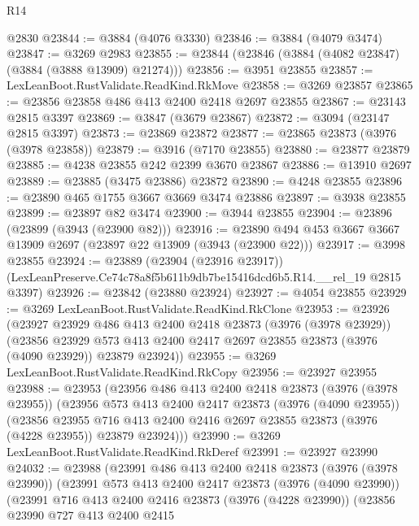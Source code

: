\begin{lexlean}{R14}
\begin{coremodule}
    @2830
@23844 := @3884 (@4076 @3330)
@23846 := @3884 (@4079 @3474)
@23847 := @3269 @2983
@23855 := @23844 (@23846 (@3884 (@4082 @23847) (@3884 (@3888 @13909) @21274)))
@23856 := @3951 @23855
@23857 := LexLeanBoot.RustValidate.ReadKind.RkMove
@23858 := @3269 @23857
@23865 := @23856 @23858 @486 @413 @2400 @2418 @2697 @23855
@23867 := @23143 @2815 @3397
@23869 := @3847 (@3679 @23867)
@23872 := @3094 (@23147 @2815 @3397)
@23873 := @23869 @23872
@23877 := @23865 @23873 (@3976 (@3978 @23858))
@23879 := @3916 (@7170 @23855)
@23880 := @23877 @23879
@23885 := @4238 @23855 @242 @2399 @3670 @23867
@23886 := @13910 @2697
@23889 := @23885 (@3475 @23886) @23872
@23890 := @4248 @23855
@23896 := @23890 @465 @1755 @3667 @3669 @3474 @23886
@23897 := @3938 @23855
@23899 := @23897 @82 @3474
@23900 := @3944 @23855
@23904 := @23896 (@23899 (@3943 (@23900 @82)))
@23916 := @23890 @494 @453 @3667 @3667 @13909 @2697 (@23897 @22 @13909 (@3943 (@23900 @22)))
@23917 := @3998 @23855
@23924 := @23889
    (@23904 (@23916 @23917))
    (LexLeanPreserve.Ce74c78a8f5b611b9db7be15416dcd6b5.R14.__rel_19 @2815 @3397)
@23926 := @23842 (@23880 @23924)
@23927 := @4054 @23855
@23929 := @3269 LexLeanBoot.RustValidate.ReadKind.RkClone
@23953 := @23926
    (@23927
      @23929
      @486
      @413
      @2400
      @2418
      @23873
      (@3976 (@3978 @23929))
      (@23856
        @23929
        @573
        @413
        @2400
        @2417
        @2697
        @23855
        @23873
        (@3976 (@4090 @23929))
        @23879
        @23924))
@23955 := @3269 LexLeanBoot.RustValidate.ReadKind.RkCopy
@23956 := @23927 @23955
@23988 := @23953
    (@23956
      @486
      @413
      @2400
      @2418
      @23873
      (@3976 (@3978 @23955))
      (@23956
        @573
        @413
        @2400
        @2417
        @23873
        (@3976 (@4090 @23955))
        (@23856
          @23955
          @716
          @413
          @2400
          @2416
          @2697
          @23855
          @23873
          (@3976 (@4228 @23955))
          @23879
          @23924)))
@23990 := @3269 LexLeanBoot.RustValidate.ReadKind.RkDeref
@23991 := @23927 @23990
@24032 := @23988
    (@23991
      @486
      @413
      @2400
      @2418
      @23873
      (@3976 (@3978 @23990))
      (@23991
        @573
        @413
        @2400
        @2417
        @23873
        (@3976 (@4090 @23990))
        (@23991
          @716
          @413
          @2400
          @2416
          @23873
          (@3976 (@4228 @23990))
          (@23856
            @23990
            @727
            @413
            @2400
            @2415

\end{coremodule}
\end{lexlean}
